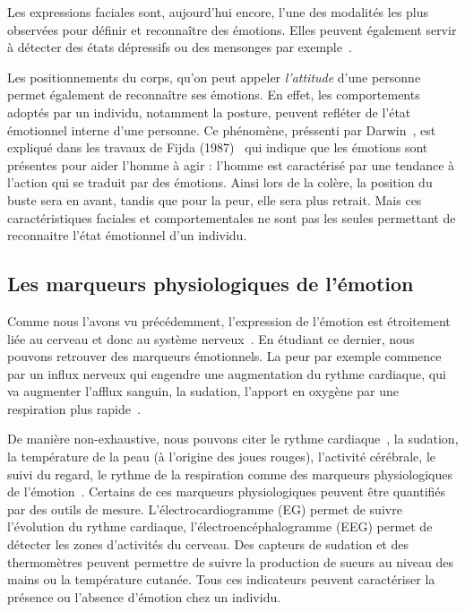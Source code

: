 Les expressions faciales sont, aujourd'hui encore, l'une des modalités les plus observées pour définir et reconnaître des émotions. Elles peuvent également servir à détecter des états dépressifs ou des mensonges par exemple~\cite{Suslow2001,Owayjan2012}.

Les positionnements du corps, qu'on peut appeler \textit{l'attitude} d'une personne permet également de reconnaître ses émotions. En effet, les comportements adoptés par un individu, notamment la posture, peuvent refléter de l'état émotionnel interne d'une personne. Ce phénomène, préssenti par Darwin~\cite{Darwin1872}, est expliqué dans les travaux de Fijda (1987)~\cite{Frijda1987} qui indique que les émotions sont présentes pour aider l'homme à agir : l'homme est caractérisé par une tendance à l'action qui se traduit par des émotions. Ainsi lors de la colère, la position du buste sera en avant, tandis que pour la peur, elle sera plus retrait. Mais ces caractéristiques faciales et comportementales ne sont pas les seules permettant de reconnaitre l'état émotionnel d'un individu.

\subsection{Les marqueurs physiologiques de l'émotion}
Comme nous l'avons vu précédemment, l'expression de l'émotion est étroitement liée au cerveau et donc au système nerveux~\cite{Dantzer2002}. En étudiant ce dernier, nous pouvons retrouver des marqueurs émotionnels. La peur par exemple commence par un influx nerveux qui engendre une augmentation du rythme cardiaque, qui va augmenter l'afflux sanguin, la sudation, l'apport en oxygène par une respiration plus rapide~\cite{Steimer2002}.

De manière non-exhaustive, nous pouvons citer le rythme cardiaque~\cite{Wiens2000}, la sudation, la température de la peau (à l'origine des joues rouges), l'activité cérébrale, le suivi du regard, le rythme de la respiration comme des marqueurs physiologiques de l'émotion~\cite{Maaoui2010,Levenson2003}. Certains de ces marqueurs physiologiques peuvent être quantifiés par des outils de mesure. L'électrocardiogramme (EG) permet de suivre l'évolution du rythme cardiaque, l'électroencéphalogramme (EEG) permet de détecter les zones d'activités du cerveau. Des capteurs de sudation et des thermomètres peuvent permettre de suivre la production de sueurs au niveau des mains ou la température cutanée. Tous ces indicateurs peuvent caractériser la présence ou l'absence d'émotion chez un individu.

